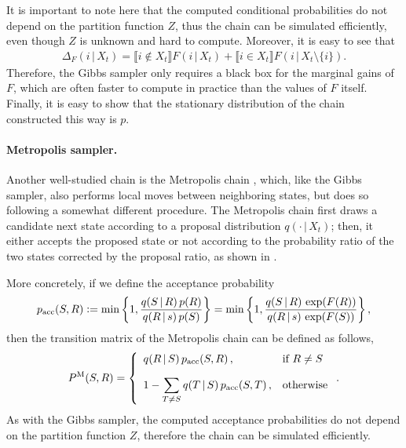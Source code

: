 It is important to note here that the computed conditional probabilities do not depend on the partition function $Z$, thus the chain can be simulated efficiently, even though $Z$ is unknown and hard to compute.
Moreover, it is easy to see that
\begin{align*}
\Delta_F(i \,|\, X_t) = \llbracket i\not\in X_t\rrbracket F(i \,|\, X_t) + \llbracket i\in X_t\rrbracket F(i \,|\, X_t\setminus\{i\}).
\end{align*}
Therefore, the Gibbs sampler only requires a black box for the marginal gains of $F$, which are often faster to compute in practice than the values of $F$ itself.
Finally, it is easy to show that the stationary distribution of the chain constructed this way is $p$.

\paragraph{Metropolis sampler.}
Another well-studied chain is the Metropolis chain \citep{metropolis,hastings}, which, like the Gibbs sampler, also performs local moves between neighboring states, but does so following a somewhat different procedure.
The Metropolis chain first draws a candidate next state according to a proposal distribution $q(\cdot\,|\,X_t)$; then, it either accepts the proposed state or not according to the probability ratio of the two states corrected by the proposal ratio, as shown in .


More concretely, if we define the acceptance probability
\begin{align*}
  p_{\textrm{acc}}(S, R) \vcentcolon= \min\left\{1, \displaystyle\frac{q(S \,|\, R)\,p(R)}{q(R \,|\, s)\,p(S)}\right\} = \min\left\{1, \displaystyle\frac{q(S \,|\, R)\,\exp(F(R))}{q(R \,|\, s)\,\exp(F(S))}\right\},
\end{align*}
then the transition matrix of the Metropolis chain can be defined as follows,
\begin{align*}
  \Pm(S, R) = \twopartdefo{q(R \,|\, S)\,p_{\textrm{acc}}(S, R)}{R \neq S\vspace{1em}}{1 - \displaystyle\sum_{T \neq S} q(T \,|\, S)\,p_{\textrm{acc}}(S, T)}.
\end{align*}
As with the Gibbs sampler, the computed acceptance probabilities do not depend on the partition function $Z$, therefore the chain can be simulated efficiently.

